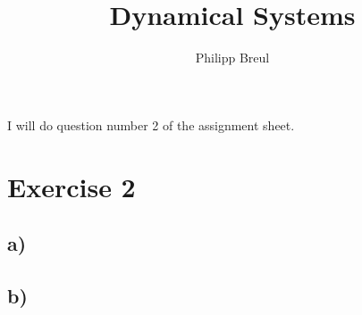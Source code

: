 \documentclass[11pt,a4paper,onecolumn]{article}
\author{Philipp Breul}
\title{Dynamical Systems}
\numberwithin{equation}{section} %
\begin{document}
\maketitle
\begin{center}
I will do question number 2 of the assignment sheet.
\end{center}
\setcounter{secnumdepth}{0}
\section{Exercise 2}
\subsection{a)}

\subsection{b)}

\FloatBarrier
{}

\end{document}

